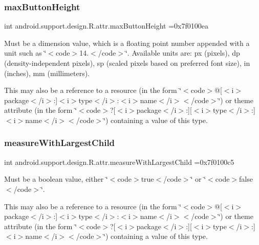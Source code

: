 \subsubsection{\texorpdfstring{max\+Button\+Height}{maxButtonHeight}}
{\footnotesize\ttfamily int android.\+support.\+design.\+R.\+attr.\+max\+Button\+Height =0x7f0100ea\hspace{0.3cm}{\ttfamily [static]}}

Must be a dimension value, which is a floating point number appended with a unit such as \char`\"{}$<$code$>$14.\+5sp$<$/code$>$\char`\"{}. Available units are\+: px (pixels), dp (density-\/independent pixels), sp (scaled pixels based on preferred font size), in (inches), mm (millimeters). 

This may also be a reference to a resource (in the form \char`\"{}$<$code$>$@\mbox{[}$<$i$>$package$<$/i$>$\+:\mbox{]}$<$i$>$type$<$/i$>$\+:$<$i$>$name$<$/i$>$$<$/code$>$\char`\"{}) or theme attribute (in the form \char`\"{}$<$code$>$?\mbox{[}$<$i$>$package$<$/i$>$\+:\mbox{]}\mbox{[}$<$i$>$type$<$/i$>$\+:\mbox{]}$<$i$>$name$<$/i$>$$<$/code$>$\char`\"{}) containing a value of this type. \mbox{\label{classandroid_1_1support_1_1design_1_1R_1_1attr_a5d0f510b241b8f09434fcd2298352dcf}} 
\subsubsection{\texorpdfstring{measure\+With\+Largest\+Child}{measureWithLargestChild}}
{\footnotesize\ttfamily int android.\+support.\+design.\+R.\+attr.\+measure\+With\+Largest\+Child =0x7f0100c5\hspace{0.3cm}{\ttfamily [static]}}

Must be a boolean value, either \char`\"{}$<$code$>$true$<$/code$>$\char`\"{} or \char`\"{}$<$code$>$false$<$/code$>$\char`\"{}. 

This may also be a reference to a resource (in the form \char`\"{}$<$code$>$@\mbox{[}$<$i$>$package$<$/i$>$\+:\mbox{]}$<$i$>$type$<$/i$>$\+:$<$i$>$name$<$/i$>$$<$/code$>$\char`\"{}) or theme attribute (in the form \char`\"{}$<$code$>$?\mbox{[}$<$i$>$package$<$/i$>$\+:\mbox{]}\mbox{[}$<$i$>$type$<$/i$>$\+:\mbox{]}$<$i$>$name$<$/i$>$$<$/code$>$\char`\"{}) containing a value of this type. \mbox{\label{classandroid_1_1support_1_1design_1_1R_1_1attr_af5ca3a58d921e381dad9f8e7d73d05c8}} 
